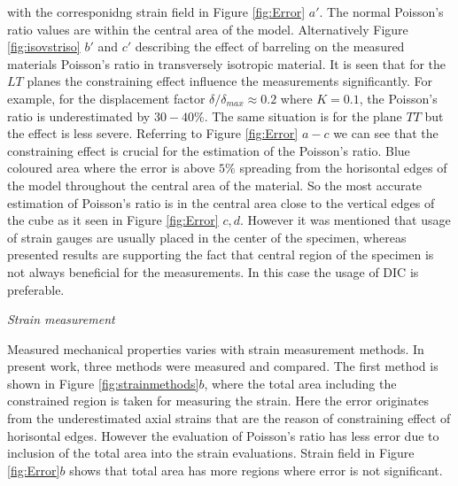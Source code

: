 \documentclass[review]{elsarticle}
\begin{document}
with the corresponidng strain field in Figure \ref{fig:Error} $a'$. The normal
Poisson's ratio values are within the central area of the model. 
Alternatively Figure \ref{fig:isovstriso} $b'$ and $c'$ describing the effect
of barreling on the measured materials Poisson's ratio in transversely isotropic material. 
It is seen that for the $LT$ planes the constraining effect influence the
measurements significantly. For example, for the displacement factor $\delta/\delta_{max}\approx0.2 $ where $K=0.1$,  the Poisson's ratio is
underestimated by $30-40\%$.
The same situation is for the plane $TT$ but the effect is less severe.
Referring to Figure \ref{fig:Error} $a-c$  we can see that the constraining effect is
crucial for the estimation of the Poisson's ratio. Blue coloured area where the error is above $5\%$ spreading from the horisontal edges of 
the model throughout the central area of the material. So the most accurate
estimation of Poisson's ratio is in the central area close to the vertical
edges of the cube as it seen in Figure \ref{fig:Error} $c,d$. However it was
mentioned that usage of strain gauges are usually placed in the center of the
specimen, whereas presented results are supporting the fact that central
region of the specimen is not always beneficial for the measurements. In this
case the usage of DIC is preferable. 


\begin{description}
\item{\textit{Strain measurement}}
\end{description}
Measured mechanical properties varies with strain measurement methods. In
present work, three methods were measured and compared. The
first method is shown in Figure \ref{fig:strainmethods}$b$, where the total area
including the constrained region is taken for measuring the strain.  
Here the error originates from the underestimated axial strains that are the
reason of constraining effect of horisontal edges. However the evaluation of
Poisson's ratio has less error due to inclusion of the total area into the
strain evaluations. Strain field in Figure \ref{fig:Error}$b$ shows that total
area has more regions where error is not significant.
\end{document}
